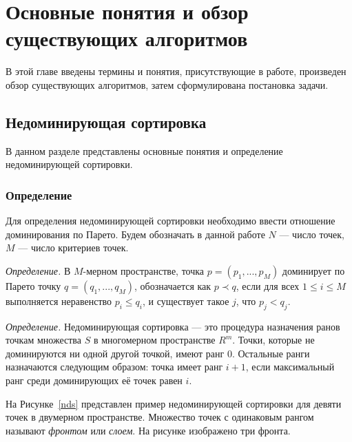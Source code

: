 
\chapter{Основные понятия и обзор существующих алгоритмов}
\label{chapter1}

В этой главе введены термины и понятия, присутствующие в работе, произведен обзор существующих алгоритмов, затем сформулирована постановка задачи.

\section{Недоминирующая сортировка}

В данном разделе представлены основные понятия и определение недоминирующей сортировки. 

\subsection{Определение}

Для определения недоминирующей сортировки необходимо ввести отношение доминирования по Парето. Будем обозначать в данной работе $N$ {---} число точек, $M$ {---} число критериев точек.

\emph{Определение.} В $M$-мерном пространстве, точка $p = (p_1,...,p_M)$ доминирует по Парето точку $q = (q_1,...,q_M)$, обозначается как $p \prec q$, если для всех $1 \leq i \leq M$ выполняется неравенство $p_i\leq q_i$, и существует такое $j$, что $p_j < q_j$.

\emph{Определение.} Недоминирующая сортировка {---} это процедура назначения ранов точкам множества $S$ в многомерном пространстве $R^m$. Точки, которые не доминируются ни одной другой точкой, имеют ранг $0$. Остальные ранги назначаются следующим образом: точка имеет ранг $i + 1$, если максимальный ранг среди
доминирующих её точек равен $i$.

На Рисунке~\ref{nds} представлен пример недоминирующей сортировки для девяти точек в двумерном пространстве. Множество точек с одинаковым рангом называют \emph{фронтом} или \emph{слоем}. На рисунке изображено три фронта. 

